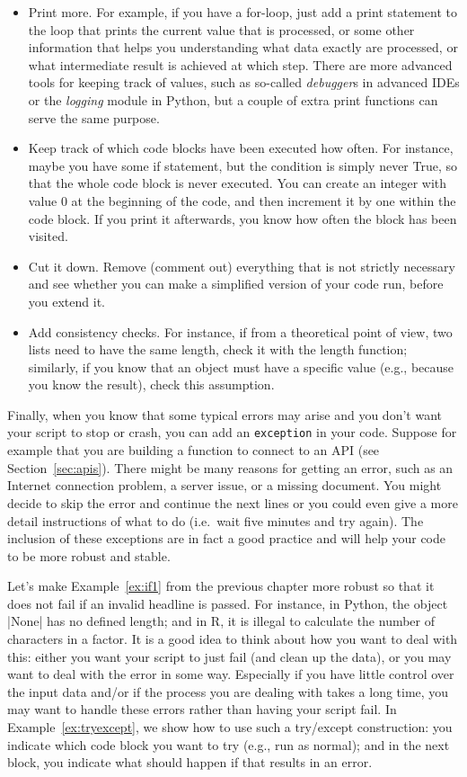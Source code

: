 \begin{itemize}
  \item Print more. For example, if you have a for-loop, just add a print statement to the loop that prints the current value that is processed, or some other information that helps you understanding what data exactly are processed, or what intermediate result is achieved at which step. There are more advanced tools for keeping track of values, such as so-called \emph{debugger}s in advanced IDEs or the \emph{logging} module in Python, but a couple of extra print functions can serve the same purpose.
  \item Keep track of which code blocks have been executed how often. For instance, maybe you have some if statement, but the condition is simply never True, so that the whole code block is never executed. You can create an integer with value 0 at the beginning of the code, and then increment it by one within the code block. If you print it afterwards, you know how often the block has been visited.
  \item Cut it down. Remove (comment out) everything that is not strictly necessary and see whether you can make a simplified version of your code run, before you extend it.
  \item Add consistency checks. For instance, if from a theoretical point of view, two lists need to have the same length, check it with the length function; similarly, if you know that an object must have a specific value (e.g., because you know the result), check this assumption.
\end{itemize}


Finally, when you know that some typical errors may arise and you don't want your script to stop or crash, you can add an \texttt{exception} in your code. Suppose for example that you are building a function to connect to an API (see Section~\ref{sec:apis}). There might be many reasons for getting an error, such as an Internet connection problem, a server issue, or a missing document. You might decide to skip  the error and continue the next lines or  you could even give a more detail instructions of what to do (i.e.\ wait five minutes and try again). The inclusion of these exceptions are in fact a good practice and will help your code to be more robust and stable.

Let's make Example~\ref{ex:if1} from the previous chapter more robust so that it does not fail if an invalid headline is passed. For instance, in Python, the object |None| has no defined length; and in R, it is illegal to calculate the number of characters in a factor. It is a good idea to think about how you want to deal with this: either you want your script to just fail (and clean up the data), or you may want to deal with the error in some way. Especially if you have little control over the input data and/or if the process you are dealing with takes a long time, you may want to  handle these errors rather than having your script fail. In Example~\ref{ex:tryexcept}, we show how to use such a try/except construction: you indicate which code block you want to try (e.g., run as normal); and in the next block, you indicate what should happen if that results in an error.

